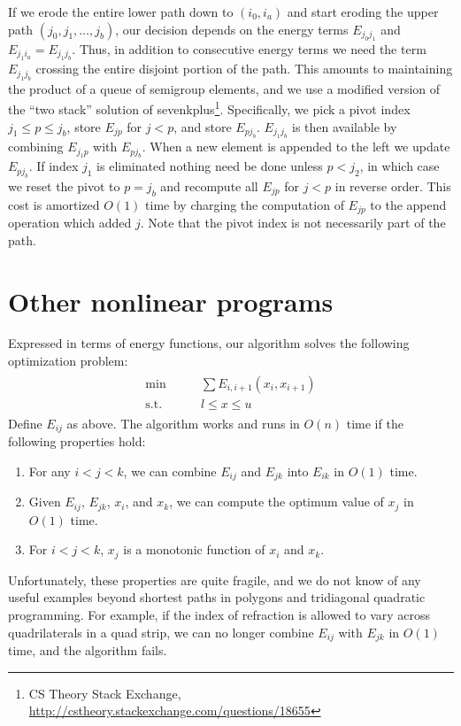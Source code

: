 \documentclass[11pt]{article}
\begin{document}
If we erode the entire lower path down to $(i_0,i_a)$ and start eroding the upper path $(j_0, j_1, \ldots, j_b)$, our decision depends on the energy terms $E_{j_0j_1}$ and $E_{j_1i_a} = E_{j_1j_b}$.
Thus, in addition to consecutive energy terms we need the term $E_{j_1j_b}$ crossing the entire disjoint portion of the path.  This amounts to maintaining the product of a queue of semigroup elements,
and we use a modified version of the ``two stack'' solution of sevenkplus\footnote{CS Theory Stack Exchange, \url{http://cstheory.stackexchange.com/questions/18655}}.  Specifically, we pick a pivot
index $j_1 \le p \le j_b$, store $E_{j p}$ for $j < p$, and store $E_{p j_b}$.  $E_{j_1 j_b}$ is then available by combining $E_{j_1 p}$ with $E_{p j_b}$.  When a new element is appended to the left
we update $E_{p j_b}$.  If index $j_1$ is eliminated nothing need be done unless $p < j_2$, in which case we reset the pivot to $p = j_b$ and recompute all $E_{j p}$ for $j < p$ in reverse order.
This cost is amortized $O(1)$ time by charging the computation of $E_{j p}$ to the append operation which added $j$.  Note that the pivot index is not necessarily part of the path.

\section{Other nonlinear programs}

Expressed in terms of energy functions, our algorithm solves the following optimization problem:
\begin{align*}
\begin{array}{cc}
\min          \qquad& \sum E_{i,i+1}(x_i,x_{i+1}) \\
\textrm{s.t.} & l \le x \le u
\end{array}
\end{align*}
Define $E_{ij}$ as above.  The algorithm works and runs in $O(n)$ time if the following properties hold:
\begin{enumerate}
\item For any $i < j < k$, we can combine $E_{ij}$ and $E_{jk}$ into $E_{ik}$ in $O(1)$ time.
\item Given $E_{ij}$, $E_{jk}$, $x_i$, and $x_k$, we can compute the optimum value of $x_j$ in $O(1)$ time.
\item For $i < j < k$, $x_j$ is a monotonic function of $x_i$ and $x_k$.
\end{enumerate}
Unfortunately, these properties are quite fragile, and we do not know of any useful examples beyond shortest paths in polygons and tridiagonal quadratic programming.  For example, if the index of
refraction is allowed to vary across quadrilaterals in a quad strip, we can no longer combine $E_{ij}$ with $E_{jk}$ in $O(1)$ time, and the algorithm fails.



\end{document}
